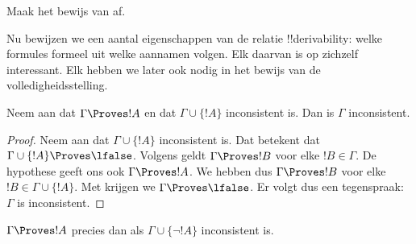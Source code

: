 \documentclass[openany]{memoir}
\begin{document}
\begin{prob}
  Maak het bewijs van  af.
\end{prob}
\endgroup

\begingroup
\def\olfilename{OLP-0121}
\def\olfilepath{content/first-order-logic/axiomatic-deduction/}
\hypertarget{unit-OLP-0121}{}



      {}
      {}


Nu bewijzen we een aantal eigenschappen van de relatie
!!{derivability}: welke formules formeel uit welke aannamen volgen.
Elk daarvan is op zichzelf interessant. Elk hebben we later ook nodig
in het bewijs van de volledigheidsstelling.

\begin{prop}
  Neem aan dat $\Gamma \Proves !A$ en dat $\Gamma \cup \{!A\}$
  inconsistent is. Dan is $\Gamma$ inconsistent.
\end{prop}

\begin{proof}
  Neem aan dat $\Gamma \cup \{!A\}$ inconsistent is. Dat betekent dat
  $\Gamma \cup \{!A\} \Proves \lfalse$. Volgens
   geldt $\Gamma \Proves !B$ voor elke
  $!B \in \Gamma$. De hypothese geeft ons ook $\Gamma \Proves !A$.
  We hebben dus $\Gamma \Proves !B$ voor elke $!B \in \Gamma \cup
  \{!A\}$. Met
   krijgen we $\Gamma \Proves \lfalse$.
  Er volgt dus een tegenspraak: $\Gamma$ is inconsistent.
\end{proof}

\begin{prop}
$\Gamma \Proves !A$ precies dan als $\Gamma \cup \{\lnot !A\}$
inconsistent is.
\end{prop}
\end{document}
